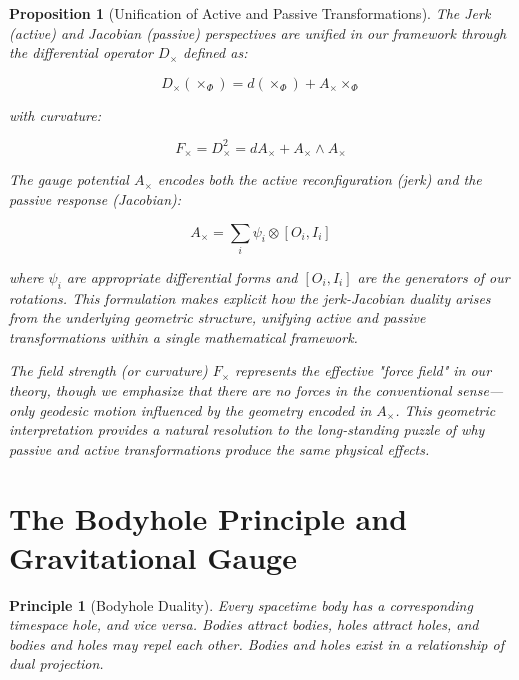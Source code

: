 \documentclass{article}
\newtheorem{proposition}{Proposition}
\newtheorem{principle}{Principle}
\begin{document}
\begin{proposition}[Unification of Active and Passive Transformations]
The Jerk (active) and Jacobian (passive) perspectives are unified in our framework through the differential operator $D_\times$ defined as:

\begin{equation}
D_\times(\times_\Phi) = d(\times_\Phi) + A_\times \times_\Phi
\end{equation}

with curvature:

\begin{equation}
F_\times = D_\times^2 = dA_\times + A_\times \wedge A_\times
\end{equation}

The gauge potential $A_\times$ encodes both the active reconfiguration (jerk) and the passive response (Jacobian):

\begin{equation}
A_\times = \sum_i \psi_i \otimes [O_i, I_i]
\end{equation}

where $\psi_i$ are appropriate differential forms and $[O_i, I_i]$ are the generators of our rotations. This formulation makes explicit how the jerk-Jacobian duality arises from the underlying geometric structure, unifying active and passive transformations within a single mathematical framework.

The field strength (or curvature) $F_\times$ represents the effective "force field" in our theory, though we emphasize that there are no forces in the conventional sense—only geodesic motion influenced by the geometry encoded in $A_\times$. This geometric interpretation provides a natural resolution to the long-standing puzzle of why passive and active transformations produce the same physical effects.
\end{proposition}

\section{The Bodyhole Principle and Gravitational Gauge}

\begin{principle}[Bodyhole Duality]
Every spacetime body has a corresponding timespace hole, and vice versa. Bodies attract bodies, holes attract holes, and bodies and holes may repel each other. Bodies and holes exist in a relationship of dual projection.
\end{principle}
\end{document}
